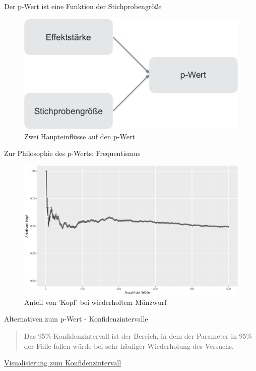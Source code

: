 \begin{frame}{Der p-Wert ist eine Funktion der Stichprobengröße}

\begin{figure}

{\centering \includegraphics[width=0.8\linewidth]{../images/inferenz/einfluss_pwert-crop} 

}

\caption{Zwei Haupteinflüsse auf den p-Wert}\label{fig:einfluss-pwert}
\end{figure}

\end{frame}

\begin{frame}{Zur Philosophie des p-Werts: Frequentismus}

\begin{figure}

{\centering \includegraphics[width=0.8\linewidth]{PraDa_Folien_nm_2_files/figure-beamer/muenzwurf-1} 

}

\caption{Anteil von 'Kopf' bei wiederholtem Münzwurf}\label{fig:muenzwurf}
\end{figure}

\end{frame}

\begin{frame}{Alternativen zum p-Wert - Konfidenzintervalle}

\begin{quote}
Das 95\%-Konfidenzintervall ist der Bereich, in dem der Parameter in
95\% der Fälle fallen würde bei sehr häufiger Wiederholung des Versuchs.
\end{quote}

\href{http://rpsychologist.com/d3/CI/}{Visualisierung zum
Konfidenzintervall}

\end{frame}

